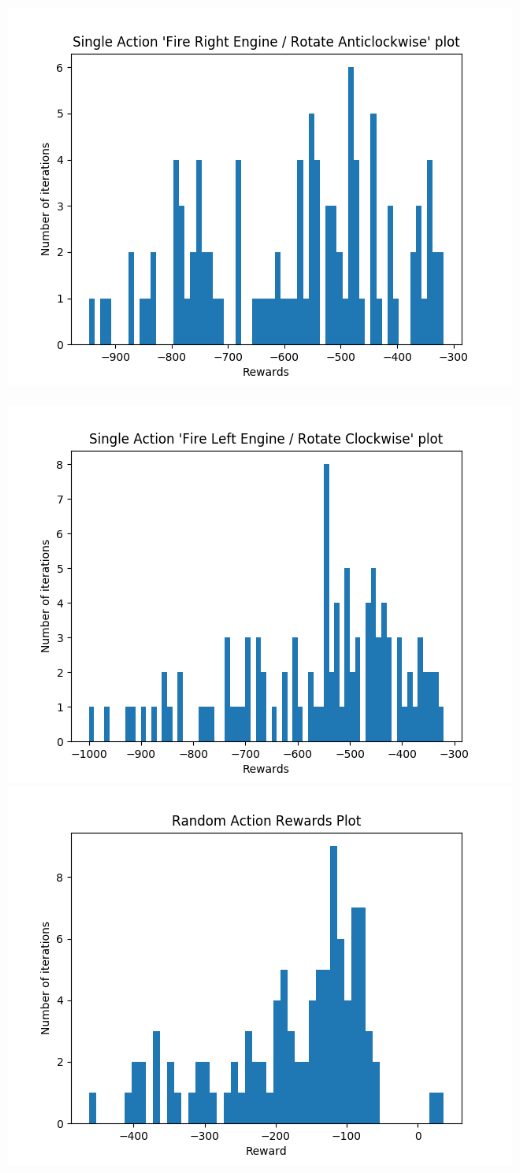 \documentclass[12pt]{article}
\begin{document}
\begin{enumerate}[label=(\alph*)]
\includegraphics[scale=0.3]{images/rotate_anticlockwise_action.png} 
\begin{center}
\includegraphics[scale=0.3]{images/rotate_clockwise_action.png}\includegraphics[scale=0.3]{images/random-action-reward-plot.png}

\end{center}
\end{enumerate}
\end{document}
